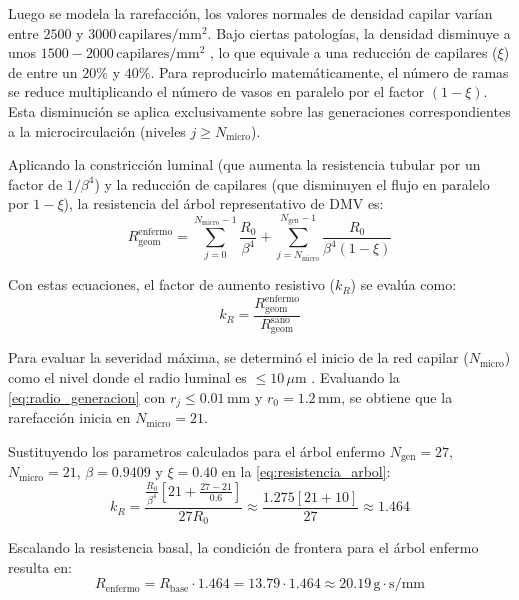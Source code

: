 \documentclass[12pt, letterpaper]{article}
\begin{document}
Luego se modela la rarefacción, los valores normales de densidad capilar varían entre $2500$ y $3000\,\mathrm{capilares/mm^2}$. Bajo ciertas patologías, la densidad disminuye a unos $1500 - 2000\,\mathrm{capilares/mm^2}$ \cite{rarefaction}, lo que equivale a una reducción de capilares ($\xi$) de entre un $20\%$ y $40\%$. Para reproducirlo matemáticamente, el número de ramas se reduce multiplicando el número de vasos en paralelo por el factor $(1-\xi)$. Esta disminución se aplica exclusivamente sobre las generaciones correspondientes a la microcirculación (niveles $j \ge N_{\mathrm{micro}}$).

Aplicando la constricción luminal (que aumenta la resistencia tubular por un factor de $1/\beta^4$) y la reducción de capilares (que disminuyen el flujo en paralelo por $1-\xi$), la resistencia del árbol representativo de DMV es:
\begin{equation}
  R_{\mathrm{geom}}^{\mathrm{enfermo}} = \sum_{j=0}^{N_{\mathrm{micro}}-1} \frac{R_0}{\beta^4} + \sum_{j=N_{\mathrm{micro}}}^{N_{\mathrm{gen}}-1} \frac{R_0}{\beta^4 (1-\xi)}
\end{equation}

Con estas ecuaciones, el factor de aumento resistivo ($k_R$) se evalúa como:
\begin{equation}
  k_R = \frac{R_{\mathrm{geom}}^{\mathrm{enfermo}}}{R_{\mathrm{geom}}^{\mathrm{sano}}}
\end{equation}

Para evaluar la severidad máxima, se determinó el inicio de la red capilar ($N_{\mathrm{micro}}$) como el nivel donde el radio luminal es $\leq 10\,\mu\mathrm{m}$ \cite{circulacion_capilar}. Evaluando la \cref{eq:radio_generacion} con $r_j \le 0.01\,\mathrm{mm}$ y $r_0 = 1.2\,\mathrm{mm}$, se obtiene que la rarefacción inicia en $N_{\mathrm{micro}} = 21$.

Sustituyendo los parametros calculados para el árbol enfermo $N_{\mathrm{gen}} = 27$, $N_{\mathrm{micro}} = 21$, $\beta = 0.9409$ y $\xi = 0.40$ en la \cref{eq:resistencia_arbol}:
\begin{equation}
  k_R = \frac{\frac{R_0}{\beta^4} \left[ 21 + \frac{27-21}{0.6} \right]}{27 R_0} \approx \frac{1.275 \left[ 21 + 10 \right]}{27} \approx 1.464
\end{equation}

Escalando la resistencia basal, la condición de frontera para el árbol enfermo resulta en:
\begin{equation} \label{eq:r_enfermo}
  R_{\mathrm{enfermo}} = R_{\mathrm{base}} \cdot 1.464 = 13.79 \cdot 1.464 \approx 20.19\,\mathrm{g \cdot s/mm}
\end{equation}
\end{document}
